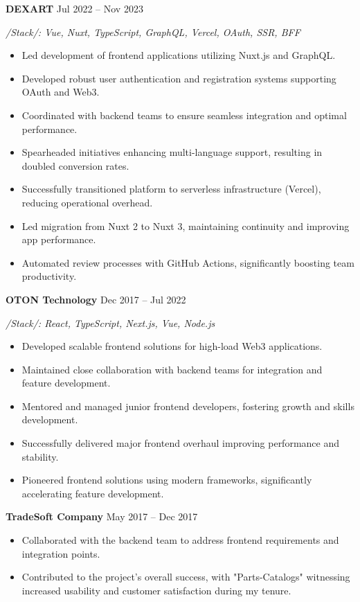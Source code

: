 \documentclass[a4paper,9pt]{article}
\begin{document}
\textbf{DEXART} \hfill Jul 2022 -- Nov 2023

\textit{/Stack/: Vue, Nuxt, TypeScript, GraphQL, Vercel, OAuth, SSR, BFF}
\begin{itemize}[leftmargin=*]
  \item Led development of frontend applications utilizing Nuxt.js and GraphQL.
  \item Developed robust user authentication and registration systems supporting OAuth and Web3.
  \item Coordinated with backend teams to ensure seamless integration and optimal performance.
  \item Spearheaded initiatives enhancing multi-language support, resulting in doubled conversion rates.
  \item Successfully transitioned platform to serverless infrastructure (Vercel), reducing operational overhead.
  \item Led migration from Nuxt 2 to Nuxt 3, maintaining continuity and improving app performance.
  \item Automated review processes with GitHub Actions, significantly boosting team productivity.
\end{itemize}
\vspace{6pt}

\textbf{OTON Technology} \hfill Dec 2017 -- Jul 2022

\textit{/Stack/: React, TypeScript, Next.js, Vue, Node.js}
\begin{itemize}[leftmargin=*]
  \item Developed scalable frontend solutions for high-load Web3 applications.
  \item Maintained close collaboration with backend teams for integration and feature development.
  \item Mentored and managed junior frontend developers, fostering growth and skills development.
  \item Successfully delivered major frontend overhaul improving performance and stability.
  \item Pioneered frontend solutions using modern frameworks, significantly accelerating feature development.
\end{itemize}
\vspace{6pt}

\textbf{TradeSoft Company} \hfill May 2017 -- Dec 2017
\begin{itemize}[leftmargin=*]
  \item Collaborated with the backend team to address frontend requirements and integration points.
  \item Contributed to the project's overall success, with "Parts-Catalogs" witnessing increased usability and customer satisfaction during my tenure.
\end{itemize}
\end{document}
